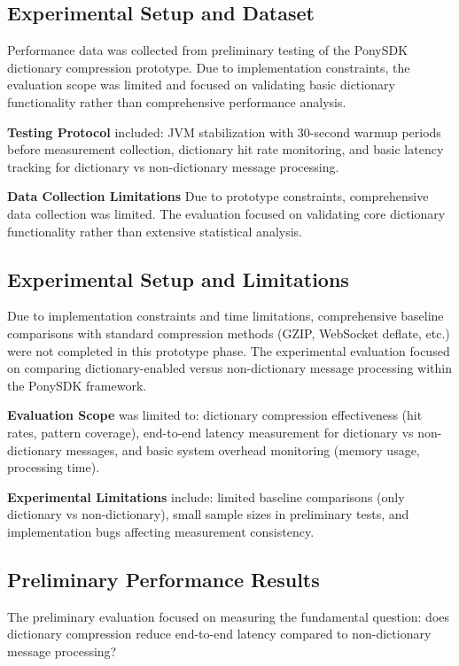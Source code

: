 \documentclass[12pt,a4paper]{article}
\begin{document}
\subsection{Experimental Setup and Dataset}

Performance data was collected from preliminary testing of the PonySDK dictionary compression prototype. Due to implementation constraints, the evaluation scope was limited and focused on validating basic dictionary functionality rather than comprehensive performance analysis.

\textbf{Testing Protocol} included: JVM stabilization with 30-second warmup periods before measurement collection, dictionary hit rate monitoring, and basic latency tracking for dictionary vs non-dictionary message processing.

\textbf{Data Collection Limitations} Due to prototype constraints, comprehensive data collection was limited. The evaluation focused on validating core dictionary functionality rather than extensive statistical analysis.

\subsection{Experimental Setup and Limitations}

Due to implementation constraints and time limitations, comprehensive baseline comparisons with standard compression methods (GZIP, WebSocket deflate, etc.) were not completed in this prototype phase. The experimental evaluation focused on comparing dictionary-enabled versus non-dictionary message processing within the PonySDK framework.

\textbf{Evaluation Scope} was limited to: dictionary compression effectiveness (hit rates, pattern coverage), end-to-end latency measurement for dictionary vs non-dictionary messages, and basic system overhead monitoring (memory usage, processing time).

\textbf{Experimental Limitations} include: limited baseline comparisons (only dictionary vs non-dictionary), small sample sizes in preliminary tests, and implementation bugs affecting measurement consistency.

\subsection{Preliminary Performance Results}

The preliminary evaluation focused on measuring the fundamental question: does dictionary compression reduce end-to-end latency compared to non-dictionary message processing?
\end{document}
